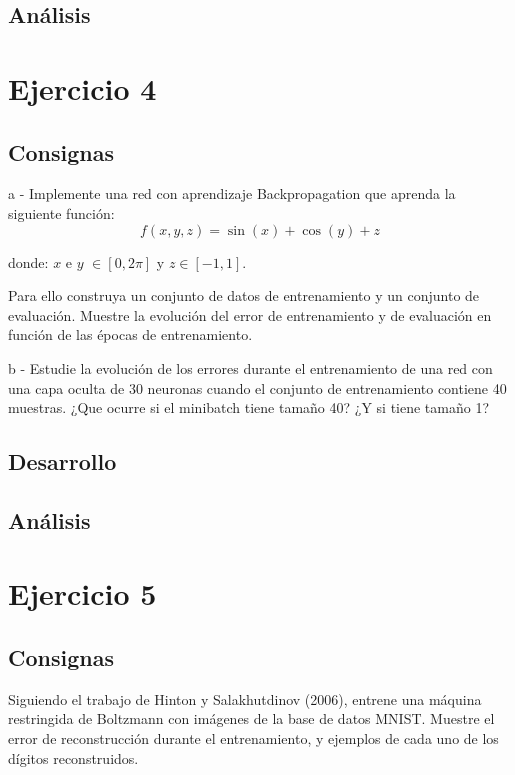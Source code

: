 \documentclass[11pt]{article} %
\begin{document}
\subsection{Análisis}

\clearpage

\section{Ejercicio 4}

\subsection{Consignas}

a - Implemente una red con aprendizaje Backpropagation que aprenda la siguiente función:
$$
f (x , y , z)= \sin(x)+\cos(y)+z
$$

donde: $x$ e $y$ $\in [0,2 \pi]$ y $z \in [-1,1]$.

Para ello construya un conjunto de datos de entrenamiento y un conjunto de evaluación. Muestre la evolución del error de entrenamiento y de evaluación en función de las épocas de entrenamiento.

b - Estudie la evolución de los errores durante el entrenamiento de una red con una capa oculta de 30 neuronas cuando el conjunto de entrenamiento contiene 40 muestras. ¿Que ocurre si el minibatch tiene tamaño 40? ¿Y si tiene tamaño 1?

\subsection{Desarrollo}

\subsection{Análisis}




\clearpage

\section{Ejercicio 5}

\subsection{Consignas}

Siguiendo el trabajo de Hinton y Salakhutdinov (2006), entrene una máquina restringida de Boltzmann con imágenes de la base de datos MNIST. Muestre el error de reconstrucción durante el entrenamiento, y ejemplos de cada uno de los dígitos reconstruidos.
\end{document}

